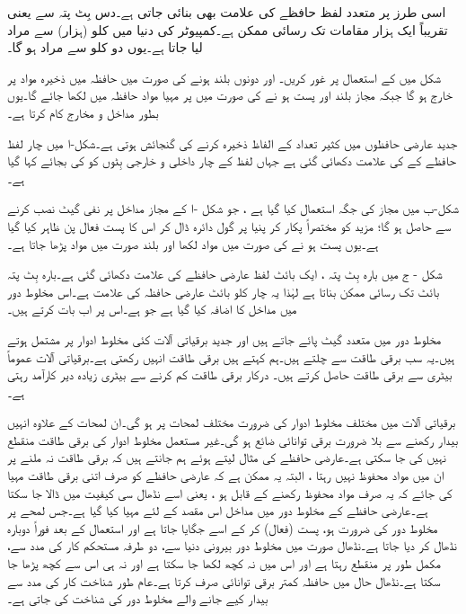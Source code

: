 اسی طرز پر متعدد لفظ حافظے کی علامت بھی بنائی جاتی ہے۔دس بِٹ پتہ سے  یعنی تقریباً ایک ہزار مقامات تک رسائی ممکن ہے۔کمپیوٹر کی دنیا میں کلو (ہزار) سے مراد لیا جاتا ہے۔یوں دو کلو سے مراد  ہو گا۔


شکل  میں  کے استعمال پر غور کریں۔ اور  دونوں بلند ہونے کی صورت میں حافظہ میں ذخیرہ مواد  پر خارج ہو گا جبکہ مجاز بلند اور  پست ہو نے کی صورت میں  پر مہیا مواد حافظہ میں لکھا جائے گا۔یوں  بطور مداخل و مخارج کام کرتا ہے۔

جدید عارضی حافظوں میں کثیر تعداد کے الفاظ ذخیرہ کرنے کی گنجائش ہوتی ہے۔شکل-ا میں چار لفظ حافظے کے  کی علامت دکھائی گئی ہے جہاں لفظ کے چار داخلی و خارجی بِٹوں کو  کی بجائے  کہا گیا ہے۔

شکل-ب میں مجاز کی جگہ  استعمال کیا گیا ہے ، جو شکل -ا کے مجاز مداخل پر نفی گیٹ نصب کرنے سے حاصل ہو گا؛ مزید  کو مختصراً  پکار کر پنیا پر گول دائرہ ڈال کر اس کا پست فعال پن ظاہر کیا گیا ہے۔یوں  پست ہو نے کی صورت میں مواد لکھا اور بلند صورت میں  مواد پڑھا جاتا ہے۔

شکل - ج میں بارہ بِٹ پتہ ، ایک بائٹ لفظ عارضی حافظے کی علامت دکھائی گئی ہے۔بارہ بِٹ پتہ  بائٹ تک رسائی ممکن بناتا ہے لہٰذا یہ چار کلو بائٹ عارضی حافظہ کی علامت ہے۔اس مخلوط دور میں  مداخل کا اضافہ کیا گیا ہے جو ہے۔اس پر اب بات کرتے ہیں۔


 مخلوط دور میں متعدد گیٹ پائے جاتے ہیں اور جدید برقیاتی آلات کئی مخلوط ادوار پر مشتمل ہوتے ہیں۔یہ سب برقی طاقت سے چلتے ہیں۔ہم کہتے ہیں برقی طاقت انہیں  رکھتی ہے۔برقیاتی آلات عموماً بیٹری سے برقی طاقت حاصل کرتے ہیں۔ درکار برقی طاقت کم کرنے سے بیٹری زیادہ دیر کارآمد رہتی ہے۔
 
برقیاتی آلات میں مختلف مخلوط ادوار کی ضرورت مختلف لمحات پر ہو گی۔ان لمحات کے علاوہ انہیں بیدار رکھنے سے بلا ضرورت برقی توانائی ضائع ہو گی۔غیر مستعمل مخلوط ادوار کی برقی طاقت منقطع نہیں کی جا سکتی ہے۔عارضی حافظے کی مثال لیتے ہوئے ہم جانتے ہیں کہ برقی طاقت نہ ملنے پر ان میں مواد محفوظ نہیں رہتا ، البتہ یہ ممکن ہے کہ عارضی حافظے کو صرف اتنی برقی طاقت مہیا کی جائے کہ یہ صرف مواد محفوظ رکھنے کے قابل ہو ، یعنی اسے نڈھال سی کیفیت میں ڈالا جا سکتا ہے۔عارضی حافظے کے مخلوط دور میں  مداخل اس مقصد کے لئے مہیا کیا گیا ہے۔جس لمحے پر مخلوط دور کی ضرورت ہو،  پست (فعال) کر کے اسے جگایا جاتا ہے اور استعمال کے بعد فوراً دوبارہ نڈھال کر دیا جاتا ہے۔نڈھال صورت میں مخلوط دور بیرونی دنیا سے، دو طرفہ مستحکم کار کی مدد سے، مکمل طور پر منقطع رہتا ہے اور اس میں نہ کچھ لکھا جا سکتا ہے اور نہ ہی اس سے کچھ پڑھا جا سکتا ہے۔نڈھال حال میں حافظہ کمتر برقی توانائی صرف کرتا ہے۔عام طور شناخت کار کی مدد سے بیدار کیے جانے والے مخلوط دور کی شناخت کی جاتی ہے۔

